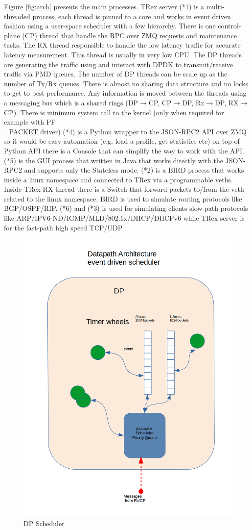 \documentclass[conference]{IEEEtran}
\begin{document}
Figure \ref{fig:arch} presents the main processes. TRex server (*1) is a multi-threaded process, each thread is pinned to a core and works in 
event driven fashion using a user-space scheduler with a few hierarchy. There is one control-plane (CP) thread that handle the RPC over ZMQ requests and maintenance tasks. 
The RX thread responsible to handle the low latency traffic for accurate latency measurement. This thread is usually in very low CPU. 
The DP threads are generating the traffic using and interact with DPDK to transmit/receive traffic via PMD queues. The number of DP threads can be scale up as the number of Tx/Rx queues. 
There is almost no sharing data structure and no locks to get to best performance. Any information is moved between the threads using a messaging bus which 
is a shared rings (DP$\rightarrow$CP, CP$\rightarrow$DP, Rx$\rightarrow$DP, RX$\rightarrow$CP).
There is minimum system call to the kernel (only when required for example with PF\\\_PACKET driver)
(*4) is a Python wrapper to the JSON-RPC2 API over ZMQ so it would be easy automation (e.g. load a profile, get statistics etc)
on top of Python API there is a Console that can simplify the way to work with the API. 
(*5) is the GUI process that written in Java that works directly with the JSON-RPC2 and supports only the Stateless mode.
(*2) is a BIRD \cite{b4} process that works inside a linux namespace and connected to TRex via a programmable veths. Inside TRex RX thread there is a Switch that forward packets to/from the veth related to the linux namespace. BIRD is used to simulate routing protocols like BGP/OSPF/RIP.
(*6) and (*3) is used for simulating clients slow-path protocols like ARP/IPV6-ND/IGMP/MLD/802.1x/DHCP/DHCPv6 while TRex server is for the fast-path high speed TCP/UDP

\begin{figure}[h]
  \includegraphics[width=0.3
  \textwidth, center]{trex_dp_sheduler.png}
  \caption{DP Scheduler}
  \label{fig:dp_schduler}
\end{figure}
  
\end{document}
